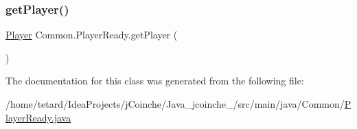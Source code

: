 \subsubsection{\texorpdfstring{get\+Player()}{getPlayer()}}
{\footnotesize\ttfamily \mbox{\hyperlink{classCommon_1_1Player}{Player}} Common.\+Player\+Ready.\+get\+Player (\begin{DoxyParamCaption}{ }\end{DoxyParamCaption})\hspace{0.3cm}{\ttfamily [inline]}}



The documentation for this class was generated from the following file\+:\begin{DoxyCompactItemize}
\item 
/home/tetard/\+Idea\+Projects/j\+Coinche/\+Java\+\_\+jcoinche\+\_/src/main/java/\+Common/\mbox{\hyperlink{PlayerReady_8java}{Player\+Ready.\+java}}\end{DoxyCompactItemize}
